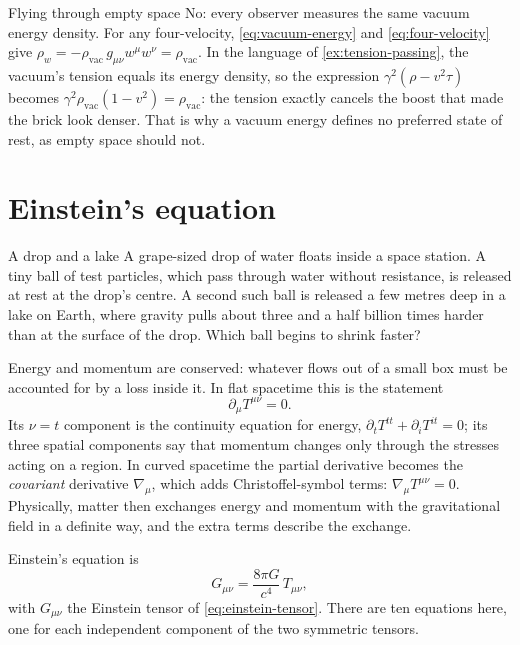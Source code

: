 \begin{revisited}{Flying through empty space}
No: every observer measures the same vacuum energy density. For any
four-velocity, \cref{eq:vacuum-energy} and \cref{eq:four-velocity} give
$\rho_{w} = -\rho_{\text{vac}}\,g_{\mu\nu}w^{\mu}w^{\nu} = \rho_{\text{vac}}$.
In the language of \cref{ex:tension-passing}, the vacuum's tension equals its
energy density, so the expression $\gamma^{2}(\rho - v^{2}\tau)$ becomes
$\gamma^{2}\rho_{\text{vac}}(1 - v^{2}) = \rho_{\text{vac}}$: the tension exactly
cancels the boost that made the brick look denser. That is why a vacuum energy
defines no preferred state of rest, as empty space should not.
\end{revisited}

\section{Einstein's equation}\label{sec:einstein}

\begin{thought}{A drop and a lake}
A grape-sized drop of water floats inside a space station. A tiny ball of test
particles, which pass through water without resistance, is released at rest
at the drop's centre. A second such ball is released a few metres deep in a
lake on Earth, where gravity pulls about three and a half billion times harder
than at the surface of the drop. Which ball begins to shrink faster?
\end{thought}

Energy and momentum are conserved: whatever flows out of a small box must be
accounted for by a loss inside it. In flat spacetime this is the statement
\begin{equation}
  \partial_{\mu}T^{\mu\nu} = 0 .
  \label{eq:conservation-flat}
\end{equation}
Its $\nu = t$ component is the continuity equation for energy,
$\partial_{t}T^{tt} + \partial_{i}T^{it} = 0$; its three spatial components say
that momentum changes only through the stresses acting on a region. In curved
spacetime the partial derivative becomes the \emph{covariant} derivative
$\nabla_{\mu}$, which adds Christoffel-symbol terms: $\nabla_{\mu}T^{\mu\nu} = 0$.
Physically, matter then exchanges energy and momentum with the gravitational
field in a definite way, and the extra terms describe the exchange.

Einstein's equation is
\begin{equation}
  G_{\mu\nu} = \frac{8\pi G}{c^{4}}\,T_{\mu\nu},
  \label{eq:einstein-si}
\end{equation}
with $G_{\mu\nu}$ the Einstein tensor of \cref{eq:einstein-tensor}. There are ten
equations here, one for each independent component of the two symmetric
tensors.

